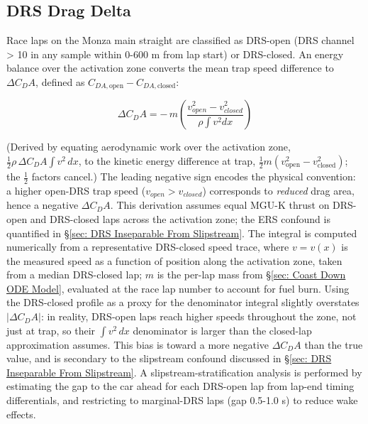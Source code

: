 \subsection[DRS Drag Delta]{DRS Drag Delta \cite{2024_FIA_regs}}
\label{sec: Methodology; DRS Drag Delta}

Race laps on the Monza main straight are classified as DRS-open (DRS channel > 10 in any sample within 0-600 m from lap start) or DRS-closed. An energy balance over the activation zone converts the mean trap speed difference to $\Delta C_DA$, defined as $C_{DA,\text{open}} - C_{DA,\text{closed}}$:

\begin{equation}
    \Delta C_DA = -\,m \left(\frac{ v_{open}^2-v_{closed}^2}{\rho \int v^2 dx}\right)
\end{equation}

(Derived by equating aerodynamic work over the activation zone, $\tfrac{1}{2}\rho\,\Delta C_DA\int v^2\,dx$, to the kinetic energy difference at trap, $\tfrac{1}{2}m(v_\text{open}^2 - v_\text{closed}^2)$; the $\tfrac{1}{2}$ factors cancel.) The leading negative sign encodes the physical convention: a higher open-DRS trap speed ($v_{open} > v_{closed}$) corresponds to \emph{reduced} drag area, hence a negative $\Delta C_DA$. This derivation assumes equal MGU-K thrust on DRS-open and DRS-closed laps across the activation zone; the ERS confound is quantified in \S\ref{sec: DRS Inseparable From Slipstream}. The integral is computed numerically from a representative DRS-closed speed trace, where $v = v(x)$ is the measured speed as a function of position along the activation zone, taken from a median DRS-closed lap; $m$ is the per-lap mass from \S\ref{sec: Coast Down ODE Model}, evaluated at the race lap number to account for fuel burn. Using the DRS-closed profile as a proxy for the denominator integral slightly overstates $|\Delta C_DA|$: in reality, DRS-open laps reach higher speeds throughout the zone, not just at trap, so their $\int v^2\,dx$ denominator is larger than the closed-lap approximation assumes. This bias is toward a more negative $\Delta C_DA$ than the true value, and is secondary to the slipstream confound discussed in \S\ref{sec: DRS Inseparable From Slipstream}. A slipstream-stratification analysis is performed by estimating the gap to the car ahead for each DRS-open lap from lap-end timing differentials, and restricting to marginal-DRS laps (gap 0.5-1.0 s) to reduce wake effects.